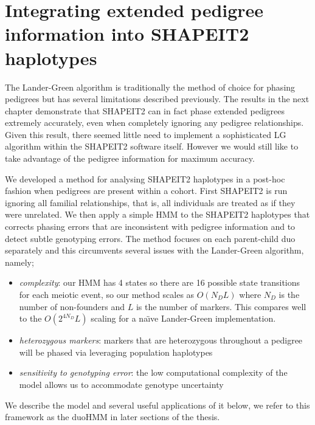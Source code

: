 \section{Integrating extended pedigree information into SHAPEIT2 haplotypes}
\label{chap3:duohmm}
The Lander-Green algorithm is traditionally the method of choice for phasing pedigrees but has several limitations described previously.  The results in the next chapter demonstrate that SHAPEIT2 can in fact phase extended pedigrees extremely accurately, even when completely ignoring any pedigree relationships.  Given this result, there seemed little need to implement a sophisticated LG algorithm within the SHAPEIT2 software itself.  However we would still like to take advantage of the pedigree information for maximum accuracy. 

 We developed a method for analysing SHAPEIT2 haplotypes in a post-hoc fashion when pedigrees are present within a cohort.  First SHAPEIT2 is run ignoring all familial relationships, that is,
 all individuals are treated as if they were unrelated. We then apply a simple HMM to the SHAPEIT2 haplotypes that corrects phasing errors that are inconsistent with pedigree information and to detect subtle genotyping errors. The method focuses on each parent-child duo separately and this circumvents several issues with the Lander-Green algorithm, namely;
\begin{itemize}
\item \emph{complexity}: our HMM has 4 states so there are 16 possible state transitions for each meiotic event, so our method scales as $O(N_DL)$ where $N_D$ is the number of non-founders and $L$ is the number of markers. This compares well to the $O(2^{4N_D}L)$ scaling for a na\"{\i}ve Lander-Green implementation.
\item \emph{heterozygous markers}: markers that are heterozygous throughout a pedigree will be phased via leveraging population haplotypes
\item \emph{sensitivity to genotyping error}: the low computational complexity of the model allows us to accommodate genotype uncertainty
\end{itemize}
We describe the model and several useful applications of it below, we refer to this framework as the duoHMM in later sections of the thesis.
